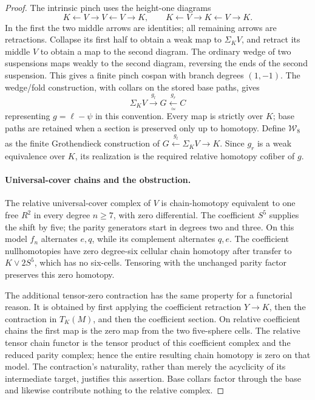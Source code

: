 \begin{proof}
The intrinsic pinch uses the height-one diagrams
\[
 K\longleftarrow V\longrightarrow V\longleftarrow V
       \longrightarrow K,\qquad
 K\longleftarrow V\longrightarrow K\longleftarrow V
       \longrightarrow K.
\]
In the first the two middle arrows are identities; all remaining
arrows are retractions. Collapse its first half to obtain a weak
map to $\Sigma_KV$, and retract its middle $V$ to obtain a map
to the second diagram. The ordinary wedge of two suspensions
maps weakly to the second diagram, reversing the ends of the
second suspension. This gives a finite pinch cospan with branch
degrees $(1,-1)$. The wedge/fold construction, with collars on
the stored base paths, gives
\[
 \Sigma_KV\xrightarrow{g_l}G\xleftarrow[\simeq]{g_r}C
\]
representing $g=\ell-\psi$ in this convention.
Every map is strictly over $K$; base paths are retained when a
section is preserved only up to homotopy.
Define $\mathcal W_8$ as the finite Grothendieck construction
of $G\xleftarrow{g_l}\Sigma_KV\to K$. Since $g_r$ is a weak
equivalence over $K$, its realization is the required relative
homotopy cofiber of $g$.

\paragraph{Universal-cover chains and the obstruction.}
The relative universal-cover complex of $V$ is chain-homotopy
equivalent to one free $R^2$ in every degree $n\geq7$, with
zero differential. The coefficient $S^5$ supplies the shift
by five; the parity generators start in degrees two and three.
On this model $f_n$ alternates $e,q$, while its complement
alternates $q,e$. The coefficient nullhomotopies have zero
degree-six cellular chain homotopy after transfer to
$K\vee2S^5$, which has no six-cells. Tensoring with the unchanged
parity factor preserves this zero homotopy.

The additional tensor-zero contraction has the same property
for a functorial reason. It is obtained by first applying the
coefficient retraction $Y\to K$, then the contraction in
$T_K(M)$, and then the coefficient section. On relative
coefficient chains the first map is the zero map from the two
five-sphere cells. The relative tensor chain functor is the
tensor product of this coefficient complex and the reduced
parity complex; hence the entire resulting chain homotopy is
zero on that model. The contraction's naturality, rather than
merely the acyclicity of its intermediate target, justifies
this assertion. Base collars factor through the base and
likewise contribute nothing to the relative complex.


\end{proof}
